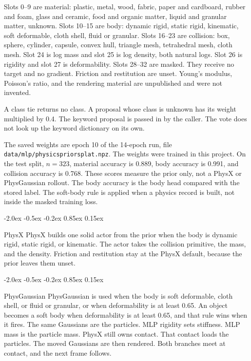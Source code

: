 \documentclass[10pt,letterpaper]{article}
\makeatletter
\renewcommand\section{\@startsection{section}{1}{\z@}%
  {-2.0ex \@plus -0.5ex \@minus -0.2ex}%
  {0.85ex \@plus 0.15ex}%
  {\large\bfseries\raggedright}}
\DeclareRobustCommand{\_}{\textunderscore\allowbreak}
\makeatother
\begin{document}
Slots 0--9 are material: plastic, metal, wood, fabric, paper and cardboard, rubber and foam, glass and ceramic, food and organic matter, liquid and granular matter, unknown.
Slots 10--15 are body: dynamic rigid, static rigid, kinematic, soft deformable, cloth shell, fluid or granular.
Slots 16--23 are collision: box, sphere, cylinder, capsule, convex hull, triangle mesh, tetrahedral mesh, cloth mesh.
Slot 24 is log mass and slot 25 is log density, both natural logs.
Slot 26 is rigidity and slot 27 is deformability.
Slots 28--32 are masked.
They receive no target and no gradient.
Friction and restitution are unset.
Young's modulus, Poisson's ratio, and the rendering material are unpublished and were not invented.

A class tie returns no class.
A proposal whose class is unknown has its weight multiplied by 0.4.
The keyword proposal is passed in by the caller.
The vote does not look up the keyword dictionary on its own.

The saved weights are epoch 10 of the 14-epoch run, file \texttt{data/mlp/physics\_prior\_splat.npz}.
The weights were trained in this project.
On the test split, \(n = 323\), material accuracy is 0.889, body accuracy is 0.991, and collision accuracy is 0.768.
These scores measure the prior only, not a PhysX or PhysGaussian rollout.
The body accuracy is the body head compared with the stored label.
The soft-body rule is applied when a physics record is built, not inside the masked training loss.

\section{PhysX}
PhysX builds one solid actor from the prior when the body is dynamic rigid, static rigid, or kinematic.
The actor takes the collision primitive, the mass, and the density.
Friction and restitution stay at the PhysX default, because the prior leaves them unset.

\section{PhysGaussian}
PhysGaussian is used when the body is soft deformable, cloth shell, or fluid or granular, or when deformability is at least 0.65.
An object becomes a soft body when deformability is at least 0.65, and that rule wins when it fires.
The same Gaussians are the particles.
MLP rigidity sets stiffness.
MLP mass is the particle mass.
PhysX still owns contact.
That contact loads the particles.
The moved Gaussians are then rendered.
Both branches meet at contact, and the next frame follows.
\end{document}
